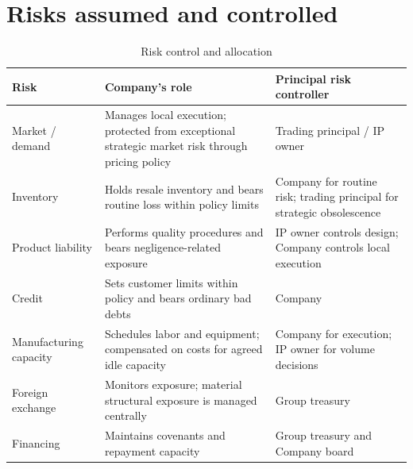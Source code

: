\section{Risks assumed and controlled}
\begin{table}[htbp]
  \centering
  \caption{Risk control and allocation}
  \small
  \begin{tabularx}{\textwidth}{@{}P{31mm}Y Y@{}}
    \toprule
    \textbf{Risk} & \textbf{Company's role} & \textbf{Principal risk controller}\\
    \midrule
    Market / demand & Manages local execution; protected from exceptional strategic market risk through pricing policy & Trading principal / IP owner\\
    Inventory & Holds resale inventory and bears routine loss within policy limits & Company for routine risk; trading principal for strategic obsolescence\\
    Product liability & Performs quality procedures and bears negligence-related exposure & IP owner controls design; Company controls local execution\\
    Credit & Sets customer limits within policy and bears ordinary bad debts & Company\\
    Manufacturing capacity & Schedules labor and equipment; compensated on costs for agreed idle capacity & Company for execution; IP owner for volume decisions\\
    Foreign exchange & Monitors exposure; material structural exposure is managed centrally & Group treasury\\
    Financing & Maintains covenants and repayment capacity & Group treasury and Company board\\
    \bottomrule
  \end{tabularx}
\end{table}
